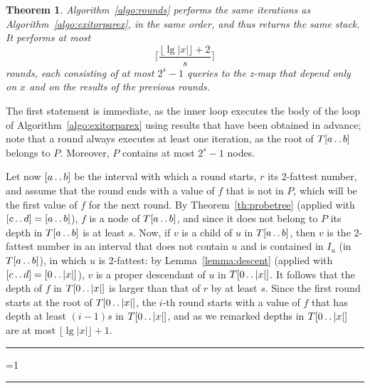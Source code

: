 \documentclass[a4paper]{article}
\newcounter{noqed}
\newcommand{\qed}{ \ifmmode\mbox{
}\fi\rule[-.05em]{.3em}{.7em}\setcounter{noqed}{0}}
\newenvironment{proof}[1][{}]{\noindent{\bf Proof#1.
}\setcounter{noqed}{1}}{\ifnum\value{noqed}=1\qed\fi\par\medskip}
\newtheorem{theorem}{Theorem}
\newcommand{\?}{\mskip1.5mu}
\def\..{\,\mathpunct{\ldotp\ldotp}} %
\begin{document}
\begin{theorem}
\label{th:rounds}
Algorithm~\ref{algo:rounds} performs the same iterations as Algorithm~\ref{algo:exitorparex}, in the same order, and thus 
returns the same stack. It performs at most 
\[
\biggl\lceil\frac{\lfloor\lg|x|\rfloor+2}s\biggr\rceil
\]
rounds, each consisting of at most $2^s-1$ queries to the z-map that depend only on $x$ and on the results of the previous rounds.
\end{theorem}
\begin{proof}
The first statement is immediate, as the inner loop executes the body of the loop of Algorithm~\ref{algo:exitorparex} using results 
that have been obtained in advance; note that a round always executes at least one iteration, as the root of $T[a\..b]$ belongs to $P$. 
Moreover, $P$ contains at most $2^s-1$ nodes. 

Let now $[a\..b]$ be the interval with which a round starts, $r$ its 2-fattest number, and assume that the round ends with a 
value of $f$ that is not in $P$, which will be the first value of $f$ for the next round. By Theorem~\ref{th:probetree} (applied with $[c\..d]=[a\..b]$), $f$ is a node of $T[a\..b]$,
and since it does not belong to $P$ its depth in $T[a\..b]$ is at least $s$. Now, if $v$ is a child of $u$ in $T[a\..b]$, then 
$v$ is the 2-fattest number in an interval that does not contain $u$ and is contained in $I_u$ (in $T[a\..b]$), in which $u$ is 2-fattest: by 
Lemma~\ref{lemma:descent} (applied with $[c\..d]=[0\..|x|]$), $v$ is a proper descendant of $u$ in $T[0\..|x|]$. 
It follows that the depth of $f$ in $T[0\..|x|]$ is larger than that of $r$ by at least $s$. Since the first round starts at the root of $T[0\..|x|]$, the $i$-th round 
starts with a value of $f$ that has depth at least $(i-1)s$ in $T[0\..|x|]$, and as we remarked depths in $T[0\..|x|]$ are at most $\lfloor\lg|x|\rfloor+1$.\qed
\end{proof}
\end{document}
